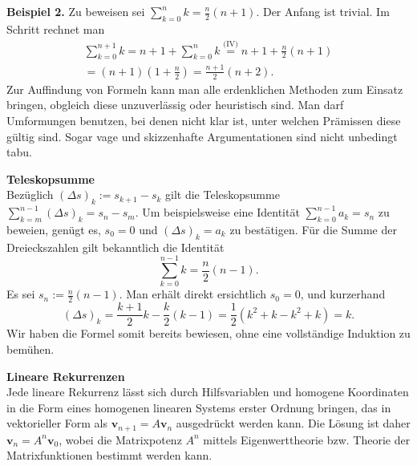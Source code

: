 \documentclass[paper=180mm:225mm,pagesize=auto,fleqn,twoside,11pt,dvipdfmx]{scrartcl}
\theoremstyle{rmbox}
\newenvironment{Rezept}[1]{\strong{#1}\\}{}
\newcommand{\strong}[1]{\textsf{\textbf{#1}}}
\begin{document}
\strong{Beispiel 2.} Zu beweisen sei $\sum_{k=0}^n k = \tfrac{n}{2}(n+1)$.
Der Anfang ist trivial. Im Schritt rechnet man
\begin{gather*}
\sum_{k=0}^{n+1} k = n+1+\sum_{k=0}^n k
\stackrel{\text{(IV)}} = n+1+\tfrac{n}{2}(n+1)\\
= (n+1)(1+\tfrac{n}{2})
= \tfrac{n+1}{2}(n+2).
\end{gather*}
Zur Auffindung von Formeln kann man alle erdenklichen Methoden
zum Einsatz bringen, obgleich diese unzuverlässig oder heuristisch
sind. Man darf Umformungen benutzen, bei denen nicht klar ist,
unter welchen Prämissen diese gültig sind. Sogar vage und skizzenhafte
Argumentationen sind nicht unbedingt tabu.

\newpage
\begin{Rezept}{Teleskopsumme}
Bezüglich $(\Delta s)_k := s_{k+1}-s_k$ gilt die
Teleskopsumme $\sum_{k=m}^{n-1} (\Delta s)_k = s_n - s_m$.
Um beispielsweise eine Identität $\sum_{k=0}^{n-1} a_k = s_n$
zu beweien, genügt es, $s_0=0$ und $(\Delta s)_k = a_k$ zu bestätigen.
\end{Rezept}
Für die Summe der Dreieckszahlen gilt bekanntlich die Identität
\[\sum_{k=0}^{n-1} k = \frac{n}{2}(n-1).\]
Es sei $s_n:=\frac{n}{2}(n-1)$. Man erhält direkt ersichtlich $s_0=0$,
und kurzerhand
\[(\Delta s)_k = \frac{k+1}{2}k - \frac{k}{2}(k-1)
= \frac{1}{2}(k^2 + k - k^2 + k) = k.\]
Wir haben die Formel somit bereits bewiesen, ohne eine vollständige
Induktion zu bemühen.

\begin{Rezept}{Lineare Rekurrenzen}
Jede lineare Rekurrenz lässt sich durch Hilfsvariablen und homogene
Koordinaten in die Form eines homogenen linearen Systems erster Ordnung
bringen, das in vektorieller Form als $\mathbf v_{n+1}=A\mathbf v_n$
ausgedrückt werden kann. Die Lösung ist daher
$\mathbf v_n = A^n\mathbf v_0$, wobei die Matrixpotenz $A^n$ mittels
Eigenwerttheorie bzw. Theorie der Matrixfunktionen bestimmt werden
kann.
\end{Rezept}
\end{document}
